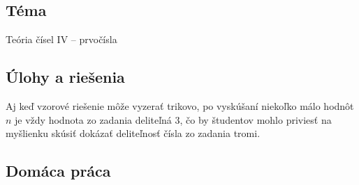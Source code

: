 
\subsection*{Téma}
Teória čísel IV -- prvočísla

\subsection*{Úlohy a riešenia}















\kom Aj keď vzorové riešenie môže vyzerať trikovo, po vyskúšaní niekoľko málo hodnôt $n$ je vždy hodnota zo zadania deliteľná 3, čo by študentov mohlo priviesť na myšlienku skúsiť dokázať deliteľnosť čísla zo zadania tromi.







\subsection*{Domáca práca}







